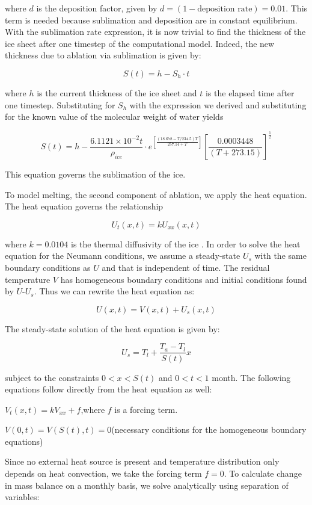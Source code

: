 \documentclass[12pt,a4paper,titlepage]{article}
\begin{document}
where $d$ is the deposition factor, given by $d
=(1-\textrm{deposition rate})=0.01$. This term is needed because
sublimation and deposition are in constant equilibrium. With the
sublimation rate expression, it is now trivial to find the
thickness of the ice sheet after one timestep of the computational
model. Indeed, the new thickness due to ablation via sublimation
is given by:

\[
S(t)=h-S_h\cdot t
\]

where $h$ is the current thickness of the ice sheet and $t$ is the
elapsed time after one timestep. Substituting for $S_h$ with the
expression we derived and substituting for the known value of the
molecular weight of water yields

\[
S(t)=h-\frac{6.1121\times10^{-2}t}{\rho_{ice}}\cdot
e^{[\frac{(18.678-T/234.5)T}{257.14+T}]}[\frac{0.0003448}{(T+273.15)}]^\frac{1}{2}
\]

This equation governs the sublimation of the ice.

To model melting, the second component of ablation, we apply the
heat equation. The heat equation governs the relationship

\[
U_t(x,t)=kU_{xx}(x,t)
\]

where $k=0.0104$ is the thermal diffusivity of the ice . In order
to solve the heat equation for the Neumann conditions, we assume a
steady-state $U_s$ with the same boundary conditions as $U$ and
that is independent of time. The residual temperature $V$ has
homogeneous boundary conditions and initial conditions found by
$U$-$U_s$. Thus we can rewrite the heat equation as:

\[
U(x,t)=V(x,t)+U_s(x,t)
\]

The steady-state solution of the heat equation is given by:

\[
U_s=T_l+\frac{T_a-T_l}{S(t)}x
\]

subject to the constraints $0<x< S(t)$ and $0<t<1$ month. The
following equations follow directly from the heat equation as
well:

$V_t(x,t)=kV_{xx}+f$,where $f$ is a forcing term.

$V(0,t)=V(S(t),t)=0$(necessary conditions for the homogeneous
boundary equations)

Since no external heat source is present and temperature
distribution only depends on heat convection, we take the forcing
term $f = 0$. To calculate change in mass balance on a monthly
basis, we solve analytically using separation of variables:
\end{document}
